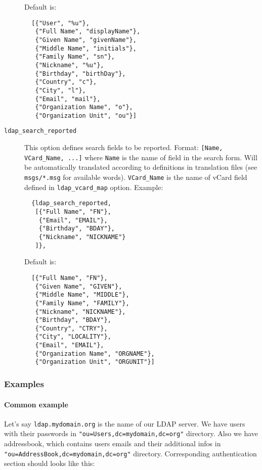 \documentclass[a4paper,10pt]{article}
\newcommand{\ind}[1]{\begin{latexonly}\index{#1}\end{latexonly}}
\newcommand{\bracehack}{\def\{{\char"7B}\def\}{\char"7D}}
\newcommand{\titem}[1]{\item[\bracehack\texttt{#1}]}
\newcommand{\option}[1]{\texttt{#1}}
\newcommand{\term}[1]{\texttt{#1}}
\begin{document}
\begin{description}
Default is:
\begin{verbatim}
  [{"User", "%u"},
   {"Full Name", "displayName"},
   {"Given Name", "givenName"},
   {"Middle Name", "initials"},
   {"Family Name", "sn"},
   {"Nickname", "%u"},
   {"Birthday", "birthDay"},
   {"Country", "c"},
   {"City", "l"},
   {"Email", "mail"},
   {"Organization Name", "o"},
   {"Organization Unit", "ou"}]
\end{verbatim}
\titem{ldap\_search\_reported} \ind{options!ldap_search_reported}This option defines search fields to be reported.
	Format:
		\term{[{Name, VCard\_Name}, ...]}
	where
		\term{Name} is the name of field in the search form. Will be automatically
			translated according to definitions in translation files (see
			\term{msgs/*.msg} for available words).
		\term{VCard\_Name} is the name of vCard field defined in \option{ldap\_vcard\_map} option.
                Example:
\begin{verbatim}
  {ldap_search_reported,
   [{"Full Name", "FN"},
    {"Email", "EMAIL"},
    {"Birthday", "BDAY"},
    {"Nickname", "NICKNAME"}
   ]},
\end{verbatim}

Default is:
\begin{verbatim}
  [{"Full Name", "FN"},
   {"Given Name", "GIVEN"},
   {"Middle Name", "MIDDLE"},
   {"Family Name", "FAMILY"},
   {"Nickname", "NICKNAME"},
   {"Birthday", "BDAY"},
   {"Country", "CTRY"},
   {"City", "LOCALITY"},
   {"Email", "EMAIL"},
   {"Organization Name", "ORGNAME"},
   {"Organization Unit", "ORGUNIT"}]
\end{verbatim}
\end{description}


\subsubsection{Examples}
\label{sec:ldapexamples}

\paragraph{Common example}

Let's say \term{ldap.mydomain.org} is the name of our LDAP server. We have
users with their passwords in \term{"ou=Users,dc=mydomain,dc=org"} directory.
Also we have addressbook, which contains users emails and their additional
infos in \term{"ou=AddressBook,dc=mydomain,dc=org"} directory.  Corresponding
authentication section should looks like this:
\end{document}

